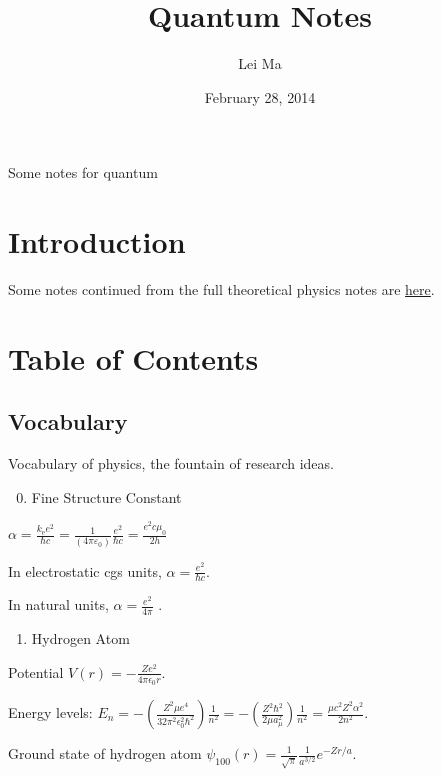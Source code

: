 \documentclass[letterpaper,10pt,english]{sphinxmanual}
\title{Quantum Notes}
\date{February 28, 2014}
\author{Lei Ma}
\begin{document}
\maketitle
\tableofcontents
{}\label{index::doc}


Some notes for quantum


\chapter{Introduction}
\label{index:introduction}\label{index:quantum-notes}
Some notes continued from the full theoretical physics notes are \href{http://cosmologytaskforce.github.io/PhysicsResearchSurvivalManual/}{here}.


\chapter{Table of Contents}
\label{index:table-of-contents}

\section{Vocabulary}
\label{vocabulary::doc}\label{vocabulary:vocabulary}
Vocabulary of physics, the fountain of research ideas.
\begin{enumerate}
\setcounter{enumi}{-1}
\item {} 
Fine Structure Constant

\end{enumerate}

$\alpha = \frac{k_\mathrm{e} e^2}{\hbar c} = \frac{1}{(4 \pi \varepsilon_0)} \frac{e^2}{\hbar c} = \frac{e^2 c \mu_0}{2 h}$

In electrostatic cgs units, $\alpha = \frac{e^2}{\hbar c}$.

In natural units, $\alpha = \frac{e^2}{4 \pi}$ .
\begin{enumerate}
\item {} 
Hydrogen Atom

\end{enumerate}

Potential $V(r) = -\frac{Z e^2}{4\pi \epsilon_0 r}$.

Energy levels: $E_{n} = -\left(\frac{Z^2 \mu e^4}{32 \pi^2\epsilon_0^2\hbar^2}\right)\frac{1}{n^2} = -\left(\frac{Z^2\hbar^2}{2\mu a_{\mu}^2}\right)\frac{1}{n^2} = \frac{\mu c^2Z^2\alpha^2}{2n^2}.$

Ground state of hydrogen atom $\psi_{100}(r)=\frac{1}{\sqrt{\pi}}\frac{1}{a^{3/2}} e^{-Z r/a}$.
\end{document}
